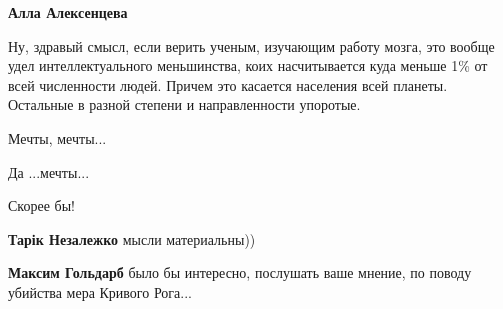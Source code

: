 \begin{itemize}
\begin{itemize}
\textbf{Алла Алексенцева} 

Ну, здравый смысл, если верить ученым, изучающим работу мозга, это вообще удел
интеллектуального меньшинства, коих насчитывается куда меньше 1\% от всей
численности людей. Причем это касается населения всей планеты. Остальные в
разной степени и направленности упоротые.

\end{itemize}

 
Мечты, мечты...

 
Да ...мечты...

 
Скорее бы!

\begin{itemize}
 
\textbf{Тарік Незалежко} мысли материальны))

 
\textbf{Максим Гольдарб} было бы интересно, послушать ваше мнение, по поводу убийства мера Кривого Рога...

 

\end{itemize}
\end{itemize}
